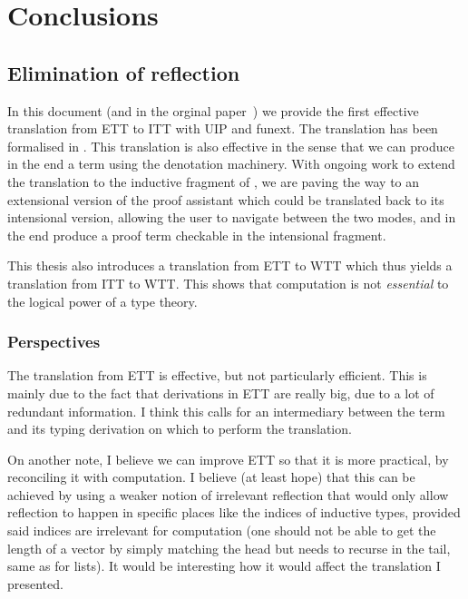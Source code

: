 \chapter{Conclusions}

\section*{Elimination of reflection}

In this document (and in the orginal paper~)
we provide the first effective translation from \acrshort{ETT} to \acrshort{ITT}
with \acrshort{UIP} and \acrshort{funext}. The translation has been formalised
in \Coq.
This translation is also effective in the sense that we can produce in the end a
\Coq term using the \MetaCoq denotation machinery.
%
With ongoing work to extend the translation to the inductive fragment
of \Coq, we are paving the way to an extensional version of the \Coq
proof assistant which could be translated back to its intensional
version, allowing the user to navigate between the two modes, and in
the end produce a proof term checkable in the intensional fragment.

This thesis also introduces a translation from \acrshort{ETT} to \acrshort{WTT}
which thus yields a translation from \acrshort{ITT} to \acrshort{WTT}. This
shows that computation is not \emph{essential} to the logical power of a type
theory.

\subsection*{Perspectives}

The translation from \acrshort{ETT} is effective, but not particularly
efficient. This is mainly due to the fact that derivations in \acrshort{ETT}
are really big, due to a lot of redundant information. I think this calls for
an intermediary between the term and its typing derivation on which to perform
the translation.

On another note, I believe we can improve \acrshort{ETT} so that it is more
practical, by reconciling it with computation. I believe (at least hope) that
this can be achieved by using a weaker notion of irrelevant reflection that
would only allow reflection to happen in specific places like the indices of
inductive types, provided said indices are irrelevant for computation (one
should not be able to get the length of a vector by simply matching the head
but needs to recurse in the tail, same as for lists).
It would be interesting how it would affect the translation I presented.

